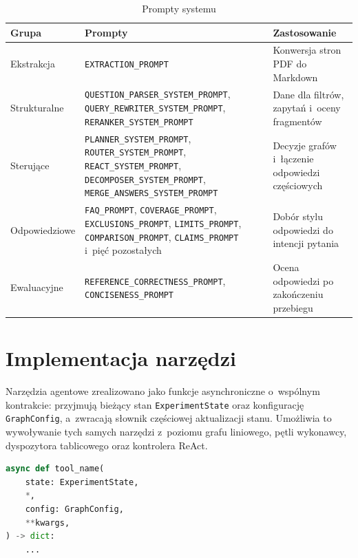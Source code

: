 \begin{table}[H]
  \caption{Prompty systemu}\label{tab:prompty-systemu}
  \centering
  \small
  \begin{tabularx}{\textwidth}{@{} l L L @{}}
    \toprule
    \textbf{Grupa}
    & \textbf{Prompty}
    & \textbf{Zastosowanie}                            \\
    \midrule
    Ekstrakcja
    & \texttt{EXTRACTION\_PROMPT}
    & Konwersja stron PDF do Markdown                  \\
    Strukturalne
    & \texttt{QUESTION\_PARSER\_SYSTEM\_PROMPT},
    \texttt{QUERY\_REWRITER\_SYSTEM\_PROMPT},
    \texttt{RERANKER\_SYSTEM\_PROMPT}
    & Dane dla filtrów, zapytań i~oceny fragmentów     \\
    Sterujące
    & \texttt{PLANNER\_SYSTEM\_PROMPT},
    \texttt{ROUTER\_SYSTEM\_PROMPT},
    \texttt{REACT\_SYSTEM\_PROMPT},
    \texttt{DECOMPOSER\_SYSTEM\_PROMPT},
    \texttt{MERGE\_ANSWERS\_SYSTEM\_PROMPT}
    & Decyzje grafów i~łączenie odpowiedzi częściowych \\
    Odpowiedziowe
    & \texttt{FAQ\_PROMPT}, \texttt{COVERAGE\_PROMPT},
    \texttt{EXCLUSIONS\_PROMPT}, \texttt{LIMITS\_PROMPT},
    \texttt{COMPARISON\_PROMPT}, \texttt{CLAIMS\_PROMPT}
    i~pięć pozostałych
    & Dobór stylu odpowiedzi do intencji pytania       \\
    Ewaluacyjne
    & \texttt{REFERENCE\_CORRECTNESS\_PROMPT},
    \texttt{CONCISENESS\_PROMPT}
    & Ocena odpowiedzi po zakończeniu przebiegu        \\
    \bottomrule
  \end{tabularx}
\end{table}

\section{Implementacja narzędzi}\label{sec:implementacja-narzedzi}

Narzędzia agentowe zrealizowano jako funkcje asynchroniczne o~wspólnym
kontrakcie: przyjmują bieżący stan \texttt{ExperimentState} oraz konfigurację
\texttt{GraphConfig}, a~zwracają słownik częściowej aktualizacji stanu.
Umożliwia to wywoływanie tych samych narzędzi z~poziomu grafu liniowego, pętli
wykonawcy, dyspozytora tablicowego oraz kontrolera ReAct.

\begin{lstlisting}[language=Python,
  caption={Kontrakt narzędzia agentowego},
  label={lst:kontrakt-narzedzia-agentowego}]
async def tool_name(
    state: ExperimentState,
    *,
    config: GraphConfig,
    **kwargs,
) -> dict:
    ...
\end{lstlisting}

